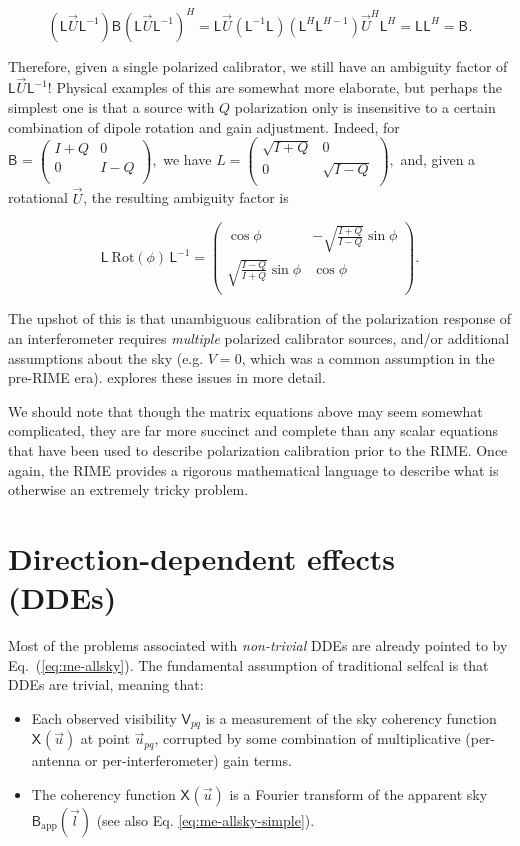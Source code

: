 \documentclass{aa}
\newcommand{\matrixtt}[4]{\left( \begin{array}{cc}#1&#2\\#3&#4\\\end{array} \right)}
\newcommand{\herm}{H}
\newcommand{\jones}[2]{\vec {#1}_{#2}}
\newcommand{\jonesT}[2]{\vec {#1}^{\herm}_{#2}}
\newcommand{\coh}[2]{\mathsf{{#1}}_{{#2}}}
\begin{document}
\[
(\coh{L}{} \jones{U}{} \coh{L}{}^{-1}) \coh{B}{} (\coh{L}{} \jones{U}{} \coh{L}{}^{-1})^H = 
\coh{L}{} \jones{U}{} (\coh{L}{}^{-1}\coh{L}{})(\coh{L}{}^H\coh{L}{}^{H-1}) \jonesT{U}{}\coh{L}{}^H = \coh{L}{}\coh{L}{}^H = \coh{B}{}.
\]

Therefore, given a single polarized calibrator, we still have an ambiguity factor of $\coh{L}{} \jones{U}{} \coh{L}{}^{-1}$! Physical examples of this are somewhat more elaborate, but perhaps the simplest one is that a source with $Q$ polarization only is insensitive to a certain combination of dipole rotation and gain adjustment. Indeed, for $\coh{B}{}=\matrixtt{I+Q}{0}{0}{I-Q},$ we have $L=\matrixtt{\sqrt{I+Q}}{0}{0}{\sqrt{I-Q}},$ and, given a rotational $\jones{U}{}$, the resulting ambiguity factor is

\[
\coh{L}{} \, \mathrm{Rot}(\phi) \, \coh{L}{}^{-1} = \matrixtt{\cos\phi}{-\sqrt{\frac{I+Q}{I-Q}}\sin\phi}{\sqrt{\frac{I-Q}{I+Q}}\sin\phi}{\cos\phi}.
\]

The upshot of this is that unambiguous calibration of the polarization response of an interferometer requires {\em multiple} polarized calibrator sources, and/or additional assumptions about the sky (e.g. $V=0$, which was a common assumption in the pre-RIME era). \citet{ME5} explores these issues in more detail.

We should note that though the matrix equations above may seem somewhat complicated, they are far more succinct and complete than any scalar equations that have been used to describe polarization calibration prior to the RIME. Once again, the RIME provides a rigorous mathematical language to describe what is otherwise an extremely tricky problem.


\section{\label{sec:ddes}Direction-dependent effects (DDEs)}

Most of the problems associated with \emph{non-trivial} DDEs are already pointed to by Eq.~(\ref{eq:me-allsky}). The fundamental assumption of traditional selfcal is that DDEs are trivial, meaning that:

\begin{itemize}
\item Each observed visibility $\coh{V}{pq}$ is a measurement of the sky coherency function $\coh{X}{}(\vec u)$ at point $\vec u_{pq}$, corrupted by some combination of multiplicative (per-antenna or per-interferometer) gain terms.

\item The coherency function $\coh{X}{}(\vec u)$ is a Fourier transform of the apparent sky $\coh{B}{\mathrm{app}}(\vec l)$ (see also Eq. \ref{eq:me-allsky-simple}).
\end{itemize}
\end{document}
